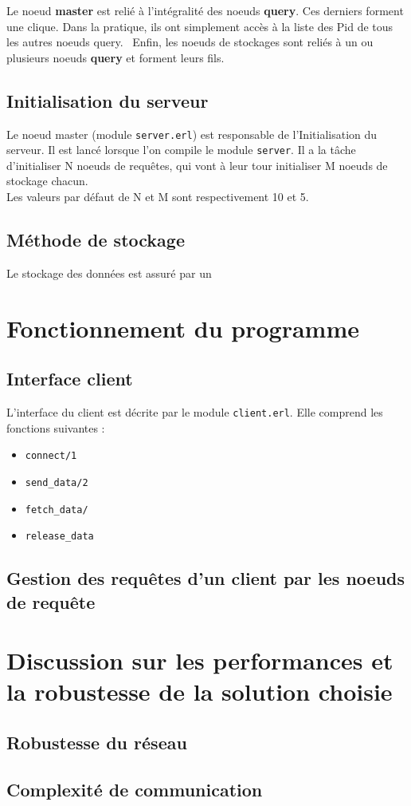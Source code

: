 \documentclass[a4paper]{article}
\begin{document}
Le noeud \textbf{master} est relié à l'intégralité des noeuds \textbf{query}. Ces derniers
forment une clique. Dans la pratique, ils ont simplement accès à la liste des Pid de tous les autres noeuds query. \
Enfin, les noeuds de stockages sont reliés à un ou plusieurs noeuds \textbf{query} et forment leurs fils.

\section{Initialisation du serveur}

Le noeud master (module \texttt{server.erl}) est responsable de l'Initialisation du serveur. Il est lancé lorsque l'on
compile le module \texttt{server}. Il a la tâche d'initialiser N noeuds de requêtes, qui vont à leur tour initialiser M noeuds de stockage chacun. \\
Les valeurs par défaut de N et M sont respectivement 10 et 5.

\section{Méthode de stockage}
Le stockage des données est assuré par un

\chapter{Fonctionnement du programme}
\label{chap:fonctionnement}

\section{Interface client}

L'interface du client est décrite par le module \texttt{client.erl}. Elle comprend les fonctions suivantes :
\begin{itemize}
    \item \texttt{connect/1}
    \item \texttt{send\_data/2}
    \item \texttt{fetch\_data/}
    \item \texttt{release\_data}
\end{itemize}

\section{Gestion des requêtes d'un client par les noeuds de requête}

\chapter{Discussion sur les performances et la robustesse de la solution choisie}
\label{chap:discussion}

\section{Robustesse du réseau}

\section{Complexité de communication}
\end{document}
